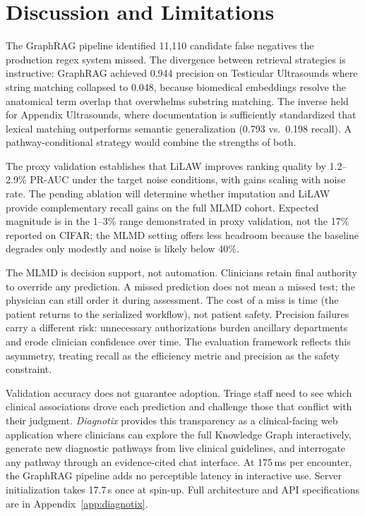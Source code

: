 \section{Discussion and Limitations}


The GraphRAG pipeline identified 11,110 candidate false negatives the production regex system missed. The divergence between retrieval strategies is instructive: GraphRAG achieved 0.944 precision on Testicular Ultrasounds where string matching collapsed to 0.048, because biomedical embeddings resolve the anatomical term overlap that overwhelms substring matching. The inverse held for Appendix Ultrasounds, where documentation is sufficiently standardized that lexical matching outperforms semantic generalization (0.793 vs.\ 0.198 recall). A pathway-conditional strategy would combine the strengths of both.

The proxy validation establishes that LiLAW improves ranking quality by 1.2--2.9\% PR-AUC under the target noise conditions, with gains scaling with noise rate. The pending ablation will determine whether imputation and LiLAW provide complementary recall gains on the full MLMD cohort. Expected magnitude is in the 1--3\% range demonstrated in proxy validation, not the 17\% reported on CIFAR; the MLMD setting offers less headroom because the baseline degrades only modestly and noise is likely below 40\%.

The MLMD is decision support, not automation. Clinicians retain final authority to override any prediction. A missed prediction does not mean a missed test; the physician can still order it during assessment. The cost of a miss is time (the patient returns to the serialized workflow), not patient safety. Precision failures carry a different risk: unnecessary authorizations burden ancillary departments and erode clinician confidence over time. The evaluation framework reflects this asymmetry, treating recall as the efficiency metric and precision as the safety constraint.

Validation accuracy does not guarantee adoption. Triage staff need to see which clinical associations drove each prediction and challenge those that conflict with their judgment. \textit{Diagnotix} provides this transparency as a clinical-facing web application where clinicians can explore the full Knowledge Graph interactively, generate new diagnostic pathways from live clinical guidelines, and interrogate any pathway through an evidence-cited chat interface. At 175\,ms per encounter, the GraphRAG pipeline adds no perceptible latency in interactive use. Server initialization takes 17.7\,s once at spin-up. Full architecture and API specifications are in Appendix~\ref{app:diagnotix}.

